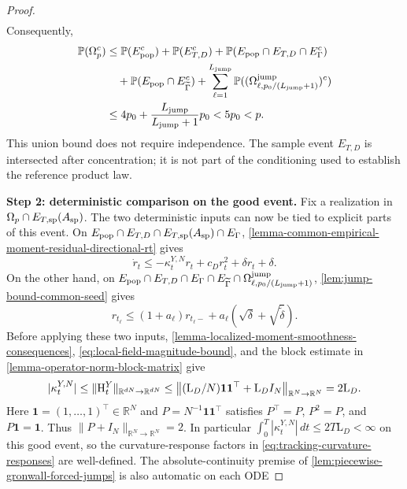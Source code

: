 \begin{proof}
\[\begin{aligned}
\end{aligned}
\]
Consequently,
\[
\begin{aligned}
 \mathbb P(\Omega_p^c)
 &\le\mathbb P(E_{\rm pop}^c)+\mathbb P(E_{T,D}^c)
      +\mathbb P(E_{\rm pop}\cap E_{T,D}\cap E_\Gamma^c)\\
 &\quad+\mathbb P(E_{\rm pop}\cap E_{\widetilde\Gamma}^c)
      +\sum_{\ell=1}^{L_{\mathrm{jump}}}
              \mathbb P((\Omega_{\ell,p_0/(L_{\mathrm{jump}}+1)}^{\rm jump})^c)\\
 &\le4p_0+\frac{L_{\mathrm{jump}}}{L_{\mathrm{jump}}+1}p_0<5p_0<p.
\end{aligned}
\]
This union bound does not require independence. The sample event $E_{T,D}$
is intersected after concentration; it is not part of the conditioning used
to establish the reference product law.

\par\noindent\textbf{Step 2: deterministic comparison on the good event.}
Fix a realization in $\Omega_p\cap E_{T,\rm sp}(A_{\rm sp})$.
The two deterministic inputs can now be tied to explicit parts of this event.
On
$E_{\rm pop}\cap E_{T,D}\cap E_{T,\rm sp}(A_{\rm sp})\cap E_\Gamma$,
\cref{lemma-common-empirical-moment-residual-directional-rt} gives
\[
 \dot r_t\le-\kappa_t^{Y,N}r_t+c_Dr_t^2+\delta r_t+\delta.
\]
On the other hand, on
$E_{\rm pop}\cap E_{T,D}\cap E_\Gamma\cap E_{\widetilde\Gamma}
\cap\Omega_{\ell,p_0/(L_{\mathrm{jump}}+1)}^{\rm jump}$,
\cref{lem:jump-bound-common-seed} gives
\[
 r_{t_\ell}\le(1+a_\ell)r_{t_\ell-}
                 +a_\ell(\sqrt\delta+\sqrt{\widetilde\delta}).
\]
Before applying these two inputs,
\cref{lemma-localized-moment-smoothness-consequences},
\eqref{eq:local-field-magnitude-bound}, and the block estimate in
\cref{lemma-operator-norm-block-matrix} give
\begin{equation}
\label{eq:fixed-schedule-curvature-bound}
 |\kappa_t^{Y,N}|\le\|\mathrm{H}_t^Y\|_{\mathbb R^{dN}\to\mathbb R^{dN}}
 \le\left\|(\mathrm L_D/N)\mathbf1\mathbf1^\top+\mathrm L_DI_N
        \right\|_{\mathbb R^N\to\mathbb R^N}=2\mathrm L_D.
\end{equation}
Here $\mathbf1=(1,\ldots,1)^\top\in\mathbb R^N$ and
$P=N^{-1}\mathbf1\mathbf1^\top$ satisfies $P^\top=P$, $P^2=P$,
and $P\mathbf1=\mathbf1$. Thus $\|P+I_N\|_{\mathbb R^N\to\mathbb R^N}=2$.
In particular $\int_0^T|\kappa_t^{Y,N}|\,dt\le2T\mathrm L_D<\infty$
on this good event, so the curvature-response factors in
\eqref{eq:tracking-curvature-responses} are well-defined.
The absolute-continuity premise of
\cref{lem:piecewise-gronwall-forced-jumps} is also automatic on each ODE

\end{proof}
